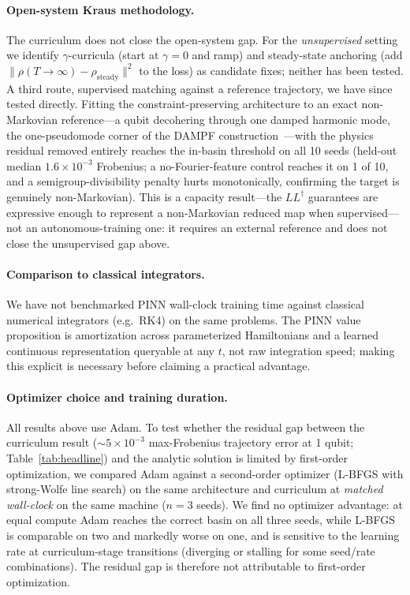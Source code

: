 \documentclass[11pt]{article}
\begin{document}
\paragraph{Open-system Kraus methodology.}
The curriculum does not close the open-system gap. For the \emph{unsupervised} setting we identify $\gamma$-curricula (start at $\gamma = 0$ and ramp) and steady-state anchoring (add $\|\rho(T \to \infty) - \rho_{\mathrm{steady}}\|^2$ to the loss) as candidate fixes; neither has been tested. A third route, supervised matching against a reference trajectory, we have since tested directly. Fitting the constraint-preserving architecture to an exact non-Markovian reference---a qubit decohering through one damped harmonic mode, the one-pseudomode corner of the DAMPF construction~\cite{somoza2019}---with the physics residual removed entirely reaches the in-basin threshold on all 10 seeds (held-out median $1.6\times10^{-3}$ Frobenius; a no-Fourier-feature control reaches it on 1 of 10, and a semigroup-divisibility penalty hurts monotonically, confirming the target is genuinely non-Markovian). This is a capacity result---the $L L^\dagger$ guarantees are expressive enough to represent a non-Markovian reduced map when supervised---not an autonomous-training one: it requires an external reference and does not close the unsupervised gap above.

\paragraph{Comparison to classical integrators.}
We have not benchmarked PINN wall-clock training time against classical numerical integrators (e.g.\ RK4) on the same problems. The PINN value proposition is amortization across parameterized Hamiltonians and a learned continuous representation queryable at any $t$, not raw integration speed; making this explicit is necessary before claiming a practical advantage.

\paragraph{Optimizer choice and training duration.}
All results above use Adam. To test whether the residual gap between the curriculum result ($\sim 5 \times 10^{-3}$ max-Frobenius trajectory error at 1 qubit; Table~\ref{tab:headline}) and the analytic solution is limited by first-order optimization, we compared Adam against a second-order optimizer (L-BFGS with strong-Wolfe line search) on the same architecture and curriculum at \emph{matched wall-clock} on the same machine ($n = 3$ seeds). We find no optimizer advantage: at equal compute Adam reaches the correct basin on all three seeds, while L-BFGS is comparable on two and markedly worse on one, and is sensitive to the learning rate at curriculum-stage transitions (diverging or stalling for some seed/rate combinations). The residual gap is therefore not attributable to first-order optimization.
\end{document}
